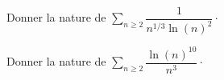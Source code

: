 \documentclass[a4paper,10pt]{report}
\newcommand{\Sum}[2]{\ensuremath{\textstyle{\sum\limits_{#1}^{#2}}}}
\begin{document}

\begin{exa} Donner la nature de $\Sum{n \geq 2}{} \dfrac{1}{n^{1/3} \ln(n)^2} \cdot$
\end{exa} 

\begin{exa} Donner la nature de $\Sum{n \geq 2}{} \dfrac{\ln(n)^{10}}{n^{3}} \cdot$
\end{exa} 


%
%
%
%
%
%
%
%
%
%
%
\end{document}
